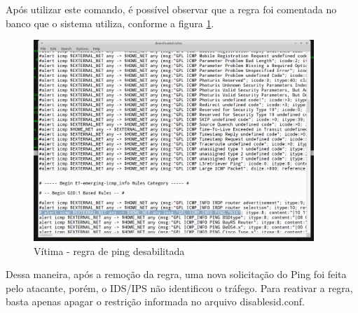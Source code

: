 Após utilizar este comando, é possível observar que a regra foi comentada no banco
que o sistema utiliza, conforme a figura \ref{fig:regra_desativada}.

 \begin{figure}[h]
  \centering
  \includegraphics[width=400px, scale=1]{resource/regra_desativada}
  \caption{Vítima - regra de ping desabilitada}
\label{fig:regra_desativada}
\end{figure}

Dessa maneira, após a remoção da regra, uma nova solicitação do Ping foi feita
 pelo atacante, porém, o IDS/IPS não identificou o tráfego. Para reativar a regra,
 basta apenas apagar o restrição informada no arquivo disablesid.conf.

